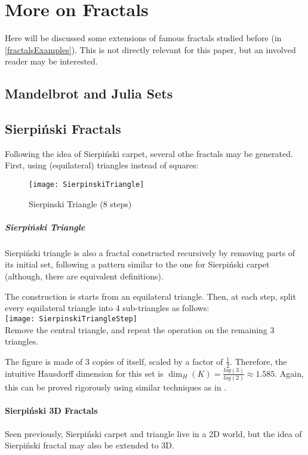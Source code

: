\section{More on Fractals}
Here will be discussed some extensions of famous fractals studied before (in \ref{fractalsExamples}).
This is not directly relevant for this paper, but an involved reader may be interested.

\subsection{Mandelbrot and Julia Sets}


\subsection{Sierpiński Fractals}
Following the idea of Sierpiński carpet, several othe fractals may be generated.
First, using (equilateral) triangles instead of squares:

\begin{wrapfigure}{r}{5cm}
	\vspace{-0.5cm}
	\texttt{[image: SierpinskiTriangle]}
	\centering
	\captionsetup{justification=centering}
	\caption{Sierpinski Triangle (8 steps)}
	\label{fig:SierpinskiTriangle}
	\vspace{-3cm}
\end{wrapfigure}
\subparagraph{Sierpiński Triangle}
Sierpiński triangle is also a fractal constructed recursively by removing parts of its initial set, following a pattern similar to the one for Sierpiński carpet (although, there are equivalent definitions).

The construction is starts from an equilateral triangle.
Then, at each step, split every equilateral triangle into 4 sub-triangles as follows:\\
\texttt{[image: SierpinskiTriangleStep]}\\
Remove the central triangle, and repeat the operation on the remaining 3 triangles.

The figure is made of $3$ copies of itself, scaled by a factor of $\frac{1}{2}$.
Therefore, the intuitive Hausdorff dimension for this set is $\dim_H(K) = \frac{log(3)}{log(2)} \approx 1.585$.
Again, this can be proved rigorously using similar techniques as in \cite[p. 34-35, ex. 2.7]{Falconer_1990}.

\paragraph{Sierpiński 3D Fractals}
Seen previously, Sierpiński carpet and triangle live in a 2D world, but the idea of Sierpiński fractal may also be extended to 3D.

